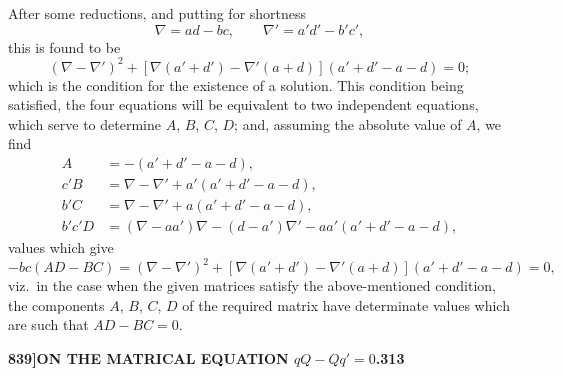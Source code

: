 \documentclass[11pt]{article}
\begin{document}
After some reductions, and putting for shortness
\[
\nabla = ad - bc, \qquad \nabla' = a'd' - b'c',
\]
this is found to be
\[
(\nabla - \nabla')^{2} + [\nabla(a' + d') - \nabla'(a + d)](a' + d' - a - d) = 0;
\]
which is the condition for the existence of a solution. This condition being satisfied, the four equations will be equivalent to two independent equations, which serve to determine $A$, $B$, $C$, $D$; and, assuming the absolute value of $A$, we find
\begin{align*}
A &= -(a' + d' - a - d), \\
c'B &= \nabla - \nabla' + a'(a' + d' - a - d), \\
b'C &= \nabla - \nabla' + a(a' + d' - a - d), \\
b'c'D &= (\nabla - aa')\nabla - (d - a')\nabla' - aa'(a' + d' - a - d),
\end{align*}
values which give
\[
-bc(AD - BC) = (\nabla - \nabla')^{2} + [\nabla(a' + d') - \nabla'(a + d)](a' + d' - a - d) = 0,
\]
viz.\ in the case when the given matrices satisfy the above-mentioned condition, the components $A$, $B$, $C$, $D$ of the required matrix have determinate values which are such that $AD - BC = 0$.

\newpage

\noindent\textbf{839]}\hfill\textbf{ON THE MATRICAL EQUATION $qQ - Qq' = 0$.}\hfill\textbf{313}

\bigskip
\end{document}
